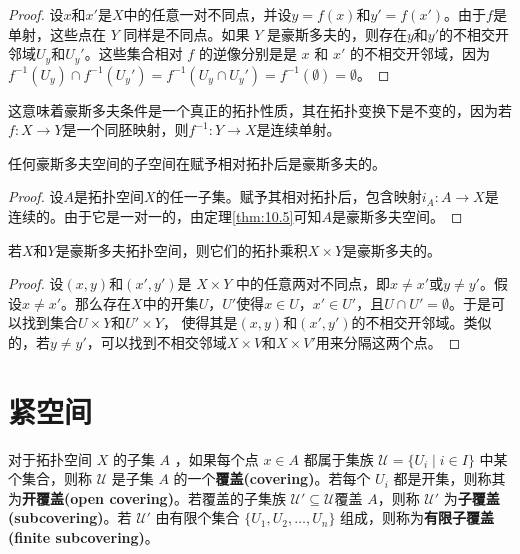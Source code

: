 \begin{proof}
	设$x$和$x'$是$X$中的任意一对不同点，并设$y=f(x)$和$y'=f(x')$。由于$f$是单射，这些点在 $Y$ 同样是不同点。如果 $Y$ 是豪斯多夫的，则存在$y$和$y'$的不相交开邻域$U_{y}$和$U_{y} '$。这些集合相对 $f$ 的逆像分别是是 $x$ 和 $x'$ 的不相交开邻域，因为$f^{-1} (U_{y} )\cap f^{-1} (U_{y} ')=f^{-1} (U_{y} \cap U_{y} ')=f^{-1} (\emptyset )=\emptyset $。
\end{proof}

	这意味着豪斯多夫条件是一个真正的拓扑性质，其在拓扑变换下是不变的，因为若$f:X\rightarrow Y$是一个同胚映射，则$f^{-1} :Y\rightarrow X$是连续单射。

\begin{corollary}\label{eg:10.6}
	任何豪斯多夫空间的子空间在赋予相对拓扑后是豪斯多夫的。
\end{corollary}

\begin{proof}
	设$A$是拓扑空间$X$的任一子集。赋予其相对拓扑后，包含映射$i_{A} :A\rightarrow X$是连续的。由于它是一对一的，由定理\ref{thm:10.5}可知$A$是豪斯多夫空间。
\end{proof}

\begin{theorem}\label{eg:10.7}
	若$X$和$Y$是豪斯多夫拓扑空间，则它们的拓扑乘积$X\times Y$是豪斯多夫的。
\end{theorem}

\begin{proof}
	设$(x,y)$和$(x',y')$是 $X\times Y$ 中的任意两对不同点，即$x\neq x'$或$y\neq y'$。假设$x\neq x'$。那么存在$X$中的开集$U$，$U'$使得$x\in U$，$x'\in U'$，且$U\cap U'=\emptyset $。于是可以找到集合$U\times Y$和$U'\times Y$， 使得其是$(x,y)$和$(x',y')$的不相交开邻域。类似的，若$y\neq y'$，可以找到不相交邻域$X\times V$和$X\times V'$用来分隔这两个点。
\end{proof}

\section{紧空间}

对于拓扑空间 $X$ 的子集 $A$ ，如果每个点 $x\in A$ 都属于集族 $\mathcal{U} =\{U_{i} \mid i\in I\}$ 中某个集合，则称 $\mathcal{U}$ 是子集 $A$ 的一个\textbf{覆盖(covering)}。若每个 $U_{i}$ 都是开集，则称其为\textbf{开覆盖(open covering)}。若覆盖的子集族 $\mathcal{U} '\subseteq \mathcal{U}$覆盖 $A$，则称 $\mathcal{U} '$ 为\textbf{子覆盖(subcovering)}。若 $\mathcal{U} '$ 由有限个集合 $\{U_{1} ,U_{2} ,\dotsc ,U_{n} \}$ 组成，则称为\textbf{有限子覆盖(finite subcovering)}。

